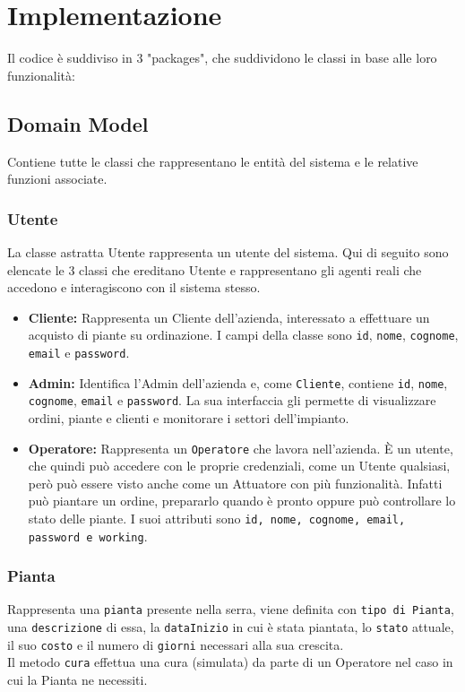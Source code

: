\documentclass{article}
\newcommand{\code}[1]{\texttt{#1}}
\begin{document}
\section{Implementazione}
Il codice è suddiviso in 3 "packages", che suddividono le classi in base alle loro funzionalità:

\subsection{Domain Model}
Contiene tutte le classi che rappresentano le entità del sistema e le relative funzioni associate.

\subsubsection{Utente}
La classe astratta Utente rappresenta un utente del sistema. 
Qui di seguito sono elencate le 3 classi che ereditano Utente e rappresentano gli agenti reali che accedono e interagiscono con il sistema stesso.

\begin{itemize}
    \item \textbf{Cliente:}
    Rappresenta un Cliente dell'azienda, interessato a effettuare un acquisto di piante su ordinazione. I campi della classe sono \code{id}, \code{nome}, \code{cognome}, \code{email} e \code{password}.

    \item \textbf{Admin:} Identifica l'Admin dell'azienda e, come \code{Cliente}, contiene \code{id}, \code{nome}, \code{cognome}, \code{email} e \code{password}. 
    La sua interfaccia gli permette di visualizzare ordini, piante e clienti e monitorare i settori dell'impianto.

    \item \textbf{Operatore:}
    Rappresenta un \code{Operatore} che lavora nell'azienda. È un utente, che quindi può accedere con le proprie credenziali, come un Utente qualsiasi, però può essere visto anche come un Attuatore con più funzionalità. Infatti può piantare un ordine, prepararlo quando è pronto oppure può controllare lo stato delle piante. I suoi attributi sono \code{id, nome, cognome, email, password e working}.
\end{itemize}

\subsubsection{Pianta}
    Rappresenta una \code{pianta} presente nella serra, viene definita con \code{tipo di Pianta}, una \code{descrizione} di essa, la \code{dataInizio} in cui è stata piantata, lo \code{stato} attuale, il suo \code{costo} e il numero di \code{giorni} necessari alla sua crescita.\\
    Il metodo \code{cura} effettua una cura (simulata) da parte di un Operatore nel caso in cui la Pianta ne necessiti.
    
\end{document}
